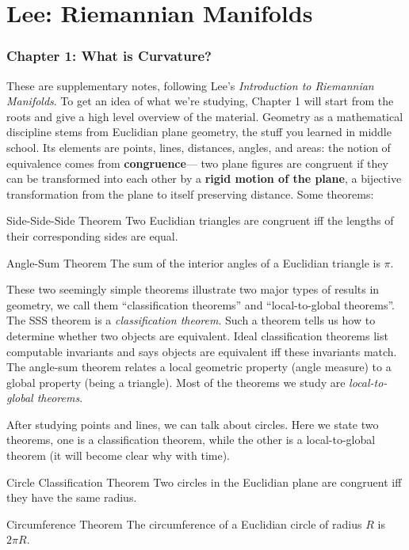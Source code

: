 \part{Lee: Riemannian Manifolds}
\section{Chapter 1: What is Curvature?}
\begin{center}
\end{center}
These are supplementary notes, following Lee's \emph{Introduction to Riemannian Manifolds}. To get an idea of what we're studying, Chapter 1 will start from the roots and give a high level overview of the material.
\orbreak
Geometry as a mathematical discipline stems from Euclidian plane geometry, the stuff you learned in middle school. Its elements are points, lines, distances, angles, and areas: the notion of equivalence comes from \textbf{congruence}— two plane figures are congruent if they can be transformed into each other by a \textbf{rigid motion of the plane}, a bijective transformation from the plane to itself preserving distance. Some theorems:
\begin{namedthm}{Side-Side-Side Theorem}
    Two Euclidian triangles are congruent iff the lengths of their corresponding sides are equal.
\end{namedthm}
\begin{namedthm}{Angle-Sum Theorem}
    The sum of the interior angles of a Euclidian triangle is $\pi$.
\end{namedthm}
These two seemingly simple theorems illustrate two major types of results in geometry, we call them ``classification theorems'' and ``local-to-global theorems''. The SSS theorem is a \emph{classification theorem}. Such a theorem tells us how to determine whether two objects are equivalent. Ideal classification theorems list computable invariants and says objects are equivalent iff these invariants match. 
The angle-sum theorem relates a local geometric property (angle measure) to a global property (being a triangle). Most of the theorems we study are \emph{local-to-global theorems}.

After studying points and lines, we can talk about circles. Here we state two theorems, one is a classification theorem, while the other is a local-to-global theorem (it will become clear why with time).
\begin{namedthm}{Circle Classification Theorem}
   Two circles in the Euclidian plane are congruent iff they have the same radius. 
\end{namedthm}
\begin{namedthm}{Circumference Theorem}
   The circumference of a Euclidian circle of radius $R$ is $2\pi R$. 
\end{namedthm}
